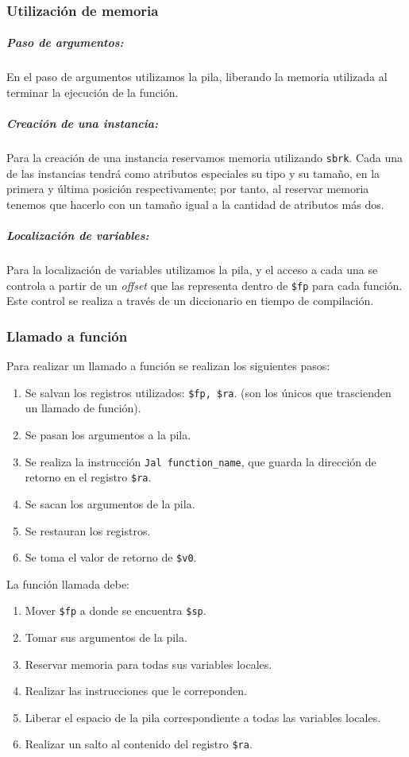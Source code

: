 \documentclass[a4paper,10pt,twocolumn]{article}
\begin{document}
\subsubsection{Utilización de memoria}

\subparagraph{Paso de argumentos:}
	 En el paso de argumentos utilizamos la pila, liberando la memoria utilizada al terminar la ejecución de la función. 
\subparagraph{Creación de una instancia:}
	Para la creación de una instancia reservamos memoria utilizando \lstinline|sbrk|. Cada una de las instancias tendrá como atributos especiales su tipo y su tamaño, en la primera y última posición respectivamente; por tanto, al reservar memoria tenemos que hacerlo con un tamaño igual a la cantidad de atributos más dos.

\subparagraph{Localización de variables:}
	Para la localización de variables utilizamos la pila, y el acceso a cada una se controla a partir de un \textit{offset} que las representa dentro de \lstinline|$fp| para cada función. Este control se realiza a través de un diccionario en tiempo de compilación. 
	
\subsubsection{Llamado a función}
	Para realizar un llamado a función se realizan los siguientes pasos:
		\begin{enumerate}
			\item Se salvan los registros utilizados: \lstinline|$fp, $ra|. (son los únicos que trascienden un llamado de función).
			\item Se pasan los argumentos a la pila.
			\item Se realiza la instrucción \lstinline|Jal function_name|, que guarda la dirección de retorno en el registro \lstinline|$ra|.
			\item Se sacan los argumentos de la pila. 
			\item Se restauran los registros. 
			\item Se toma el valor de retorno de \lstinline|$v0|. 
		\end{enumerate}
	La función llamada debe:
		\begin{enumerate}
			\item Mover \lstinline|$fp| a donde se encuentra \lstinline|$sp|. 
			\item Tomar sus argumentos de la pila. 
			\item Reservar memoria para todas sus variables locales. 
			\item Realizar las instrucciones que le correponden. 
			\item Liberar el espacio de la pila correspondiente a todas las variables locales. 
			\item Realizar un salto al contenido del registro \lstinline|$ra|. 
		\end{enumerate}
\label{end}
\end{document}
